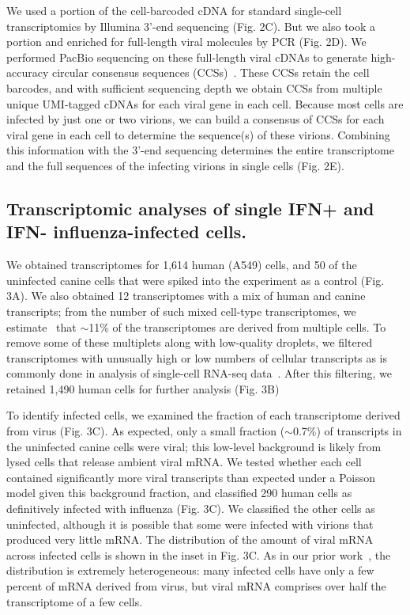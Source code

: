 \documentclass[]{article}
\begin{document}
We used a portion of the cell-barcoded cDNA for standard single-cell transcriptomics by Illumina 3'-end sequencing (Fig. 2C).
But we also took a portion and enriched for full-length viral molecules by PCR (Fig. 2D).
We performed PacBio sequencing on these full-length viral cDNAs to generate high-accuracy circular consensus sequences (CCSs)~\cite{travers2010flexible}.
These CCSs retain the cell barcodes, and with sufficient sequencing depth we obtain CCSs from multiple unique UMI-tagged cDNAs for each viral gene in each cell.
Because most cells are infected by just one or two virions, we can build a consensus of CCSs for each viral gene in each cell to determine the sequence(s) of these virions.
Combining this information with the 3'-end sequencing determines the entire transcriptome and the full sequences of the infecting virions in single cells (Fig. 2E).

\subsection*{Transcriptomic analyses of single IFN+ and IFN- influenza-infected cells.}

We obtained transcriptomes for 1,614 human (A549) cells, and 50 of the uninfected canine cells that were spiked into the experiment as a control (Fig. 3A).
We also obtained 12 transcriptomes with a mix of human and canine transcripts; from the number of such mixed cell-type transcriptomes, we estimate~\cite{bloom2018estimating} that $\sim$11\% of the transcriptomes are derived from multiple cells.
To remove some of these multiplets along with low-quality droplets, we filtered transcriptomes with unusually high or low numbers of cellular transcripts as is commonly done in analysis of single-cell RNA-seq data~\cite{haque2017practical}.
After this filtering, we retained 1,490 human cells for further analysis (Fig. 3B)

To identify infected cells, we examined the fraction of each transcriptome derived from virus (Fig. 3C).
As expected, only a small fraction ($\sim$0.7\%) of transcripts in the uninfected canine cells were viral; this low-level background is likely from lysed cells that release ambient viral mRNA.
We tested whether each cell contained significantly more viral transcripts than expected under a Poisson model given this background fraction, and classified 290 human cells as definitively infected with influenza (Fig. 3C).
We classified the other cells as uninfected, although it is possible that some were infected with virions that produced very little mRNA.
The distribution of the amount of viral mRNA across infected cells is shown in the inset in Fig. 3C.
As in our prior work~\cite{russell2018extreme}, the distribution is extremely heterogeneous: many infected cells have only a few percent of mRNA derived from virus, but viral mRNA comprises over half the transcriptome of a few cells.
\end{document}
